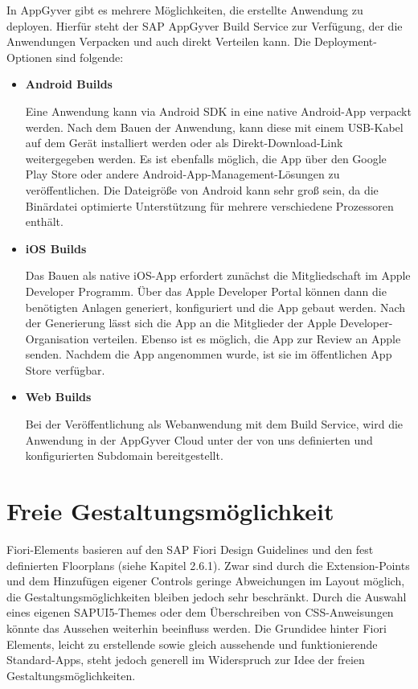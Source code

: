 In AppGyver gibt es mehrere Möglichkeiten, die erstellte Anwendung zu deployen. Hierfür steht der SAP AppGyver Build Service zur Verfügung, der die Anwendungen Verpacken und auch direkt Verteilen kann. Die Deployment-Optionen sind folgende:

\begin{itemize}[noitemsep]
\item \textbf{Android Builds} 

Eine Anwendung kann via Android SDK in eine native Android-App verpackt werden. Nach dem Bauen der Anwendung, kann diese mit einem USB-Kabel auf dem Gerät installiert werden oder als Direkt-Download-Link weitergegeben werden.  Es ist ebenfalls möglich, die App über den Google Play Store oder andere Android-App-Management-Lösungen zu veröffentlichen. Die Dateigröße von Android kann sehr groß sein, da die Binärdatei optimierte Unterstützung für mehrere verschiedene Prozessoren enthält\cite{app:bu}. 
\item \textbf{iOS Builds} 

Das Bauen als native iOS-App erfordert zunächst die Mitgliedschaft im Apple Developer Programm. Über das Apple Developer Portal können dann die benötigten Anlagen generiert, konfiguriert und die App gebaut werden. Nach der Generierung lässt sich die App an die Mitglieder der Apple Developer-Organisation verteilen. Ebenso ist es möglich, die App zur Review an Apple senden. Nachdem die App angenommen wurde, ist sie im öffentlichen App Store verfügbar\cite{app:ios}. 
\item \textbf{Web Builds} 

Bei der Veröffentlichung als Webanwendung mit dem Build Service, wird die Anwendung in der AppGyver Cloud unter der von uns definierten und konfigurierten Subdomain bereitgestellt.
\end{itemize}

\section{Freie Gestaltungsmöglichkeit}

Fiori-Elements basieren auf den SAP Fiori Design Guidelines und den fest definierten Floorplans (siehe Kapitel 2.6.1). Zwar sind durch die Extension-Points und dem Hinzufügen eigener Controls geringe Abweichungen im Layout möglich, die Gestaltungsmöglichkeiten bleiben jedoch sehr beschränkt. Durch die Auswahl eines eigenen SAPUI5-Themes oder dem Überschreiben von CSS-Anweisungen könnte das Aussehen weiterhin beeinfluss werden. Die Grundidee hinter Fiori Elements, leicht zu erstellende sowie gleich aussehende und funktionierende Standard-Apps, steht jedoch generell im Widerspruch zur Idee der freien Gestaltungsmöglichkeiten.

